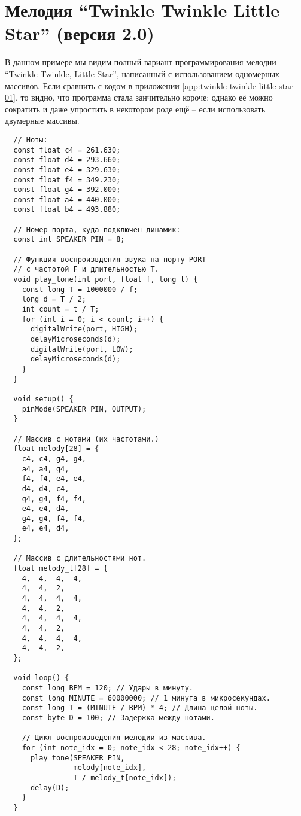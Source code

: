 \documentclass[../sparc.tex]{subfiles}
\begin{document}
\newpage
\chapter{Мелодия ``Twinkle Twinkle Little Star'' (версия 2.0)}
\label{app:twinkle-twinkle-little-star-02}

В данном примере мы видим полный вариант программирования мелодии ``Twinkle
Twinkle, Little Star'', написанный с использованием одномерных массивов. Если
сравнить с кодом в приложении \ref{app:twinkle-twinkle-little-star-01}, то
видно, что программа стала занчительно короче; однако её можно сократить и даже
упростить в некотором роде ещё -- если использовать двумерные массивы.

\begin{verbatim}
  // Ноты:
  const float c4 = 261.630;
  const float d4 = 293.660;
  const float e4 = 329.630;
  const float f4 = 349.230;
  const float g4 = 392.000;
  const float a4 = 440.000;
  const float b4 = 493.880;

  // Номер порта, куда подключен динамик:
  const int SPEAKER_PIN = 8;

  // Функция воспроизвдения звука на порту PORT
  // с частотой F и длительностью T.
  void play_tone(int port, float f, long t) {
    const long T = 1000000 / f;
    long d = T / 2;
    int count = t / T;
    for (int i = 0; i < count; i++) {
      digitalWrite(port, HIGH);
      delayMicroseconds(d);
      digitalWrite(port, LOW);
      delayMicroseconds(d);
    }
  }

  void setup() {
    pinMode(SPEAKER_PIN, OUTPUT);
  }

  // Массив с нотами (их частотами.)
  float melody[28] = {
    c4, c4, g4, g4,
    a4, a4, g4,
    f4, f4, e4, e4,
    d4, d4, c4,
    g4, g4, f4, f4,
    e4, e4, d4,
    g4, g4, f4, f4,
    e4, e4, d4,
  };

  // Массив с длительностями нот.
  float melody_t[28] = {
    4,  4,  4,  4,
    4,  4,  2,
    4,  4,  4,  4,
    4,  4,  2,
    4,  4,  4,  4,
    4,  4,  2,
    4,  4,  4,  4,
    4,  4,  2,
  };

  void loop() {
    const long BPM = 120; // Удары в минуту.
    const long MINUTE = 60000000; // 1 минута в микросекундах.
    const long T = (MINUTE / BPM) * 4; // Длина целой ноты.
    const byte D = 100; // Задержка между нотами.

    // Цикл воспроизведения мелодии из массива.
    for (int note_idx = 0; note_idx < 28; note_idx++) {
      play_tone(SPEAKER_PIN,
                melody[note_idx],
                T / melody_t[note_idx]);
      delay(D);
    }
  }
\end{verbatim}
\end{document}

